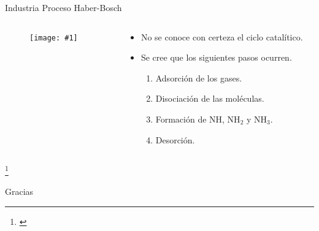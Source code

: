 \documentclass[handout]{beamer}
\newcommand\blfootnote[1]
{%
	\begingroup
	\renewcommand\thefootnote{}\footnote{#1}%
	\addtocounter{footnote}{-1}%
	\endgroup
}
\newcommand{\fcite}[1]{\blfootnote{\cite{#1}}}
\newcommand{\cfigure}[2]
{
	\begin{figure}
		\centering
		\texttt{[image: \#1]}
	\end{figure}
}
\begin{document}
\begin{frame}{Industria}
	Proceso Haber-Bosch
	\begin{columns}
		\begin{column}{0.6\textwidth}
			\cfigure{sources/haberBosch.jpg}{\linewidth}
		\end{column}
		\begin{column}{0.5\textwidth}
			\begin{itemize}
				\item No se conoce con certeza el ciclo catal\'itico.
				\item Se cree que los siguientes pasos ocurren.
				\begin{enumerate}
					\item Adsorci\'on de los gases.
					\item Disociaci\'on de las mol\'eculas.
					\item Formaci\'on de NH, NH$_2$ y NH$_3$.
					\item Desorci\'on.
				\end{enumerate}
			\end{itemize}
		\end{column}
	\end{columns}
	\fcite{van2014challenges}
\end{frame}

\begin{frame}
	\centering
	\Huge
	Gracias
\end{frame}
\end{document}
